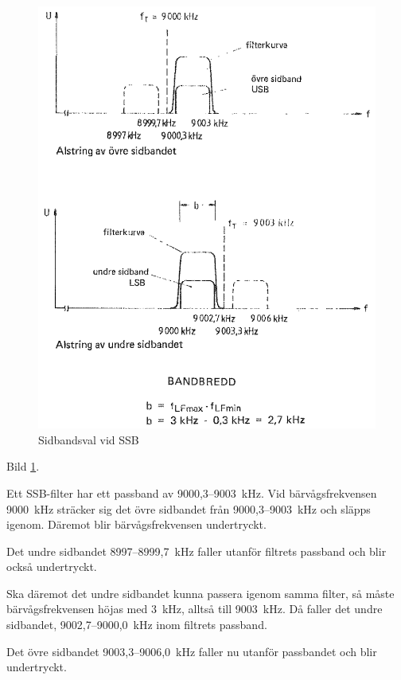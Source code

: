 \begin{figure}
\includegraphics[width=\textwidth]{images/cropped_pdfs/bild_2_1-28.pdf}
\caption{Sidbandsval vid SSB}
\label{fig:BildII1-28}
\end{figure}

Bild \ref{fig:BildII1-28}.

Ett SSB-filter har ett passband av 9000,3--9003~kHz. Vid bärvågsfrekvensen 9000~kHz
sträcker sig det övre sidbandet från 9000,3--9003~kHz och släpps igenom. Däremot
blir bärvågsfrekvensen undertryckt.

Det undre sidbandet 8997--8999,7~kHz faller utanför filtrets passband och blir
också undertryckt.

Ska däremot det undre sidbandet kunna passera igenom samma filter, så måste
bärvågsfrekvensen höjas med 3~kHz, alltså till 9003~kHz. Då faller det undre
sidbandet, 9002,7--9000,0~kHz inom filtrets passband.

Det övre sidbandet 9003,3--9006,0~kHz faller nu utanför passbandet och blir
undertryckt.

